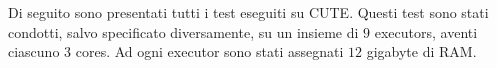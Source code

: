Di seguito sono presentati tutti i test eseguiti su CUTE.
Questi test sono stati condotti, salvo specificato diversamente, su un insieme di \(9\) executors, aventi ciascuno \(3\) cores.
Ad ogni executor sono stati assegnati \(12\) gigabyte di RAM.